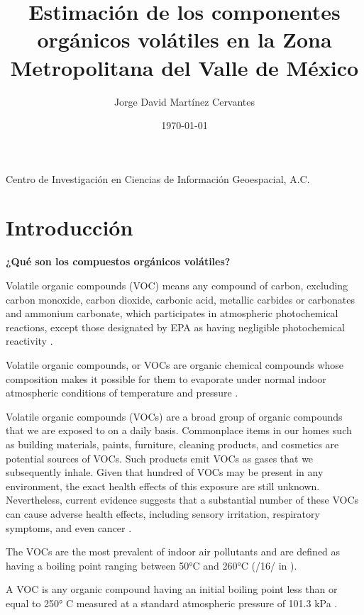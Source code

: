 \documentclass[10pt]{article}
\title{\renewcommand{\baselinestretch}{1.17}\bf%
Estimación de los componentes orgánicos volátiles en la Zona Metropolitana del Valle de México
}
\author{%
Jorge David Martínez Cervantes
}
\begin{document}
\date{\today}

\maketitle

\vspace{-0.5cm}

\begin{center}
{\footnotesize 
Centro de Investigación en Ciencias de Información Geoespacial, A.C. \\
}
\end{center}


\section{Introducción}\label{sec:1}

\textbf{¿Qué son los compuestos orgánicos volátiles?}

Volatile organic compounds (VOC) means any compound of carbon, excluding carbon monoxide, carbon dioxide, carbonic acid, metallic carbides or carbonates and ammonium carbonate, which participates in atmospheric photochemical reactions, except those designated by EPA as having negligible photochemical reactivity \cite{epavoc}.

Volatile organic compounds, or VOCs are organic chemical compounds whose composition makes it possible for them to evaporate under normal indoor atmospheric conditions of temperature and pressure \cite{epavoc}.

Volatile organic compounds (VOCs) are a broad group of organic compounds that we are exposed to on a daily basis. Commonplace items in our homes such as building materials, paints, furniture, cleaning products, and cosmetics are potential sources of VOCs. Such products emit VOCs as gases that we subsequently inhale. Given that hundred of VOCs may be present in any environment, the exact health effects of this exposure are still unknown. Nevertheless, current evidence suggests that a substantial number of these VOCs can cause adverse health effects, including sensory irritation, respiratory symptoms, and even cancer \cite{krassi-2007}.

The VOCs are the most prevalent of indoor air pollutants and are defined as having a boiling point ranging between 50°C and 260°C (/16/ in  \cite{krassi-2007}).

A VOC is any organic compound having an initial boiling point less than or equal to 250° C measured at a standard atmospheric pressure of 101.3 kPa \cite{epavoc}.
\end{document}
